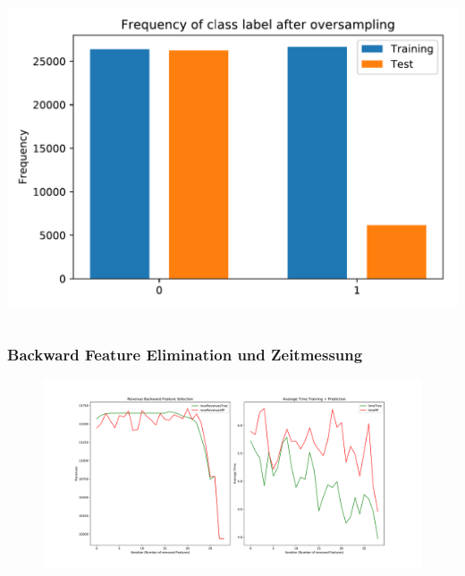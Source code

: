 \documentclass{beamer}
\begin{document}
\begin{frame}
\begin{columns}[c]
\begin{center}
\includegraphics[width=.8\textwidth]{pdf/oversampled.pdf}
\end{center}
\end{columns}
\end{frame}



%
\begin{frame}
\frametitle{Backward Feature Elimination und Zeitmessung}
\begin{figure}
\begin{center}
\includegraphics[width=1.0\textwidth]{pdf/backwardSpark.pdf}
\end{center}
\end{figure}
\end{frame}
\end{document}

